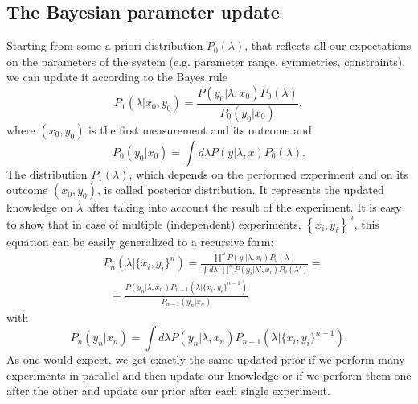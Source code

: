 \documentclass[10pt]{iopart}  %
\begin{document}
\subsection{The Bayesian parameter update}
Starting from some a priori distribution $P_0(\lambda)$, that reflects all our expectations on the parameters of the system (e.g. parameter range, symmetries, constraints), we can update it according to the Bayes rule \cite{papoulis_probability_2009}
\begin{equation}
    \label{app:eq:bayes}
    P_1(\lambda| x_0, y_0) = \frac{P(y_0|\lambda, x_0)P_0(\lambda)}{P_0(y_0|x_0)},
\end{equation}
where $(x_0, y_0)$ is the first measurement and its outcome and
\begin{equation}
    P_0(y_0|x_0) = \int d\lambda P(y|\lambda,x) P_0(\lambda).
\end{equation}
The distribution $P_1(\lambda)$, which depends on the performed experiment and on its outcome $(x_0,y_0)$, is called posterior distribution.
It represents the updated knowledge on $\lambda$ after taking into account the result of the experiment.
It is easy to show that in case of multiple (independent) experiments, $\left\{x_i, y_i \right\}^n$, this equation can be easily generalized to a recursive form:
\begin{align}
     & P_n \left(\lambda|\{x_i, y_i \}^n\right)= \frac{\prod^n P(y_i|\lambda, x_i) P_0(\lambda)}
    {\int d\lambda' \prod^n P(y_i|\lambda',x_i) P_0(\lambda')} =                                 \\
     & \;\;=
    \frac{P(y_n | \lambda, x_n) P_{n-1}\left(\lambda|\{x_i, y_i \}^{n-1}\right)}
    {P_{n-1}(y_n|x_n)}
\end{align}
with
\begin{equation}
    P_n(y_n|x_n) = \int d\lambda P(y_n|\lambda,x_n) P_{n-1}\left(\lambda|\{x_i, y_i \}^{n-1}\right).
\end{equation}
As one would expect, we get exactly the same updated prior if we perform many experiments in parallel and then update our knowledge or if we perform them one after the other and update our prior after each single experiment.
\end{document}
